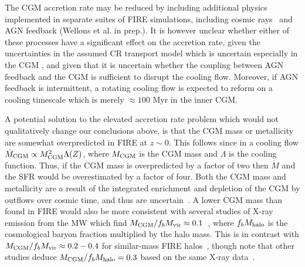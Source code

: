 \documentclass[fleqn,usenatbib]{mnras}
\newcommand{\Mdot}{\dot{M}}
\begin{document}
The CGM accretion rate may be reduced by including additional physics implemented in separate suites of FIRE simulations, including cosmic rays~\citep{Chan2019, Hopkins2020a, Hopkins2021e, Hopkins2021d} and AGN feedback (Wellons et al. in prep.).
It is however unclear whether either of these processes have a significant effect on the accretion rate, given the uncertainties in the assumed CR transport model which is uncertain especially in the CGM \citep{Hopkins2021, Quataert2021, Quataert2021a}, and given that it is uncertain whether the coupling between AGN feedback and the CGM is sufficient to disrupt the cooling flow.
Moreover, if AGN feedback is intermittent, a rotating cooling flow is expected to reform on a cooling timescale which is merely $\approx100$ Myr in the inner CGM. 

A potential solution to the elevated accretion rate problem which would not qualitatively change our conclusions above, is that the CGM mass or metallicity are somewhat overpredicted in FIRE at $z\sim0$.
This follows since in a cooling flow $\Mdot_{\rm CGM}\propto M_{\rm CGM}^2 \Lambda(Z)$, where $M_{\rm CGM}$ is the CGM mass and $\Lambda$ is the cooling function.
Thus, if the CGM mass is overpredicted by a factor of two then $\Mdot$ and the SFR would be overestimated by a factor of four.
Both the CGM mass and metallicity are a result of the integrated enrichment and depletion of the CGM by outflows over cosmic time, and thus are uncertain~\citep[e.g.,][]{Davies2021, Kelly2021}.
A lower CGM mass than found in FIRE would also be more consistent with several studies of X-ray emission from the MW which find $M_{\rm CGM}/f_bM_{\rm vir} \approx 0.1$~\citep[][]{Li2018, Bregman2018}, where $f_b M_{\rm halo}$ is the cosmological baryon fraction multiplied by the halo mass. %
This is in contrast with $M_{\rm CGM}/f_bM_{\rm vir} \approx 0.2-0.4$ for similar-mass FIRE halos~\citep{Hafen2019}, though note that other studies deduce $M_{\rm CGM}/f_bM_{\rm halo}=0.3$ based on the same X-ray data~\citep{Faerman2020}.
\end{document}
